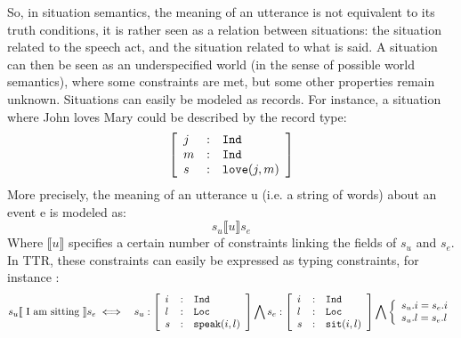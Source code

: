 \documentclass[11pt]{article}
\newenvironment{recenv}
{\left[\begin{array}{lll}}
{\end{array}\right]}
\begin{document}
			So, in situation semantics, the meaning of an utterance is not equivalent to its truth conditions, it is rather seen as a relation between situations: the situation related to the speech act, and the situation related to what is said. A situation can then be seen as an underspecified world (in the sense of possible world semantics), where some constraints are met, but some other properties remain unknown. Situations can easily be modeled as records. For instance, a situation where John loves Mary could be described by the record type:
			\begin{equation*}
				\begin{recenv}
					j &:& \texttt{Ind} \\
					m &:& \texttt{Ind} \\
					s &:& \texttt{love}(j, m)
				\end{recenv}
			\end{equation*}
			More precisely, the meaning of an utterance u (i.e. a string of words) about an event e is modeled as:
			\begin{equation*}
			 s_u \llbracket u \rrbracket s_e
			\end{equation*}
			Where $\llbracket u \rrbracket$ specifies a certain number of constraints linking the fields of $s_u$ and $s_e$. In TTR, these constraints can easily be expressed as typing constraints, for instance \cite{barwise1998}:
			\begin{eqnarray*}
				s_u \llbracket\mbox{ I am sitting } \rrbracket s_e
				&\iff&
				s_u : \begin{recenv}
					i &:& \texttt{Ind} \\
					l &:& \texttt{Loc}\\
					s &:& \texttt{speak}(i, l)
				\end{recenv} \bigwedge
				s_e : \begin{recenv}
					i &:& \texttt{Ind} \\
					l &:& \texttt{Loc}\\
					s &:& \texttt{sit}(i, l)
				\end{recenv}
				\bigwedge					
				\left\lbrace\begin{array}{l}
				s_u.i = s_e.i\\
				s_u.l = s_e.l
				\end{array}\right.
			\end{eqnarray*}
			
			
\end{document}
